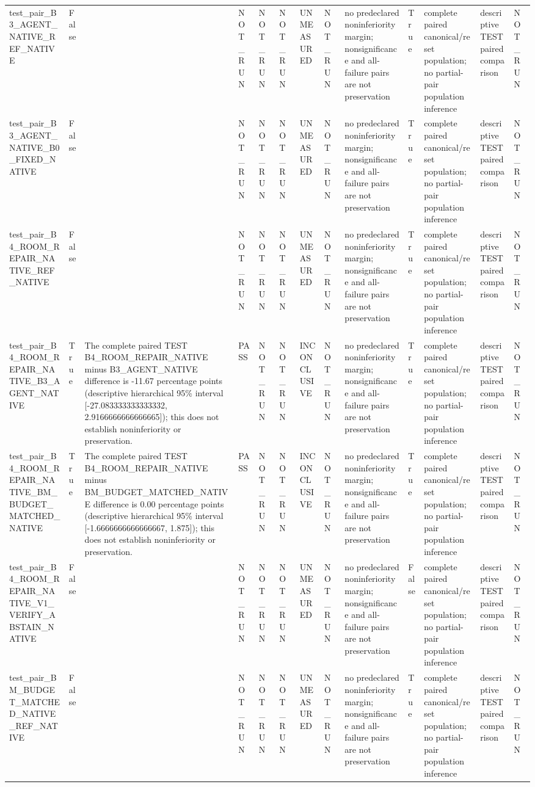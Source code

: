 \begin{tabular}{lllllllllllll}
test\_pair\_B3\_AGENT\_NATIVE\_REF\_NATIVE & False &  & NOT\_RUN & NOT\_RUN & NOT\_RUN & UNMEASURED & NOT\_RUN & no predeclared noninferiority margin; nonsignificance and all-failure pairs are not preservation & True & complete paired canonical/reset population; no partial-pair population inference & descriptive TEST paired comparison & NOT\_RUN \\
test\_pair\_B3\_AGENT\_NATIVE\_B0\_FIXED\_NATIVE & False &  & NOT\_RUN & NOT\_RUN & NOT\_RUN & UNMEASURED & NOT\_RUN & no predeclared noninferiority margin; nonsignificance and all-failure pairs are not preservation & True & complete paired canonical/reset population; no partial-pair population inference & descriptive TEST paired comparison & NOT\_RUN \\
test\_pair\_B4\_ROOM\_REPAIR\_NATIVE\_REF\_NATIVE & False &  & NOT\_RUN & NOT\_RUN & NOT\_RUN & UNMEASURED & NOT\_RUN & no predeclared noninferiority margin; nonsignificance and all-failure pairs are not preservation & True & complete paired canonical/reset population; no partial-pair population inference & descriptive TEST paired comparison & NOT\_RUN \\
test\_pair\_B4\_ROOM\_REPAIR\_NATIVE\_B3\_AGENT\_NATIVE & True & The complete paired TEST B4\_ROOM\_REPAIR\_NATIVE minus B3\_AGENT\_NATIVE difference is -11.67 percentage points (descriptive hierarchical 95\% interval [-27.083333333333332, 2.9166666666666665]); this does not establish noninferiority or preservation. & PASS & NOT\_RUN & NOT\_RUN & INCONCLUSIVE & NOT\_RUN & no predeclared noninferiority margin; nonsignificance and all-failure pairs are not preservation & True & complete paired canonical/reset population; no partial-pair population inference & descriptive TEST paired comparison & NOT\_RUN \\
test\_pair\_B4\_ROOM\_REPAIR\_NATIVE\_BM\_BUDGET\_MATCHED\_NATIVE & True & The complete paired TEST B4\_ROOM\_REPAIR\_NATIVE minus BM\_BUDGET\_MATCHED\_NATIVE difference is 0.00 percentage points (descriptive hierarchical 95\% interval [-1.6666666666666667, 1.875]); this does not establish noninferiority or preservation. & PASS & NOT\_RUN & NOT\_RUN & INCONCLUSIVE & NOT\_RUN & no predeclared noninferiority margin; nonsignificance and all-failure pairs are not preservation & True & complete paired canonical/reset population; no partial-pair population inference & descriptive TEST paired comparison & NOT\_RUN \\
test\_pair\_B4\_ROOM\_REPAIR\_NATIVE\_V1\_VERIFY\_ABSTAIN\_NATIVE & False &  & NOT\_RUN & NOT\_RUN & NOT\_RUN & UNMEASURED & NOT\_RUN & no predeclared noninferiority margin; nonsignificance and all-failure pairs are not preservation & False & complete paired canonical/reset population; no partial-pair population inference & descriptive TEST paired comparison & NOT\_RUN \\
test\_pair\_BM\_BUDGET\_MATCHED\_NATIVE\_REF\_NATIVE & False &  & NOT\_RUN & NOT\_RUN & NOT\_RUN & UNMEASURED & NOT\_RUN & no predeclared noninferiority margin; nonsignificance and all-failure pairs are not preservation & True & complete paired canonical/reset population; no partial-pair population inference & descriptive TEST paired comparison & NOT\_RUN \\
\end{tabular}
